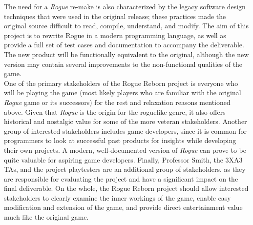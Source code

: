 \documentclass{article}
\begin{document}
The need for a \textit{Rogue} re-make is also characterized by the legacy software design techniques that were used in the original release; these practices made the original source difficult to read, compile, understand, and modify.  The aim of this project is to rewrite Rogue in a modern programming language, as well as provide a full set of test cases and documentation to accompany the deliverable.  The new product will be functionally equivalent to the original, although the new version may contain several improvements to the non-functional qualities of the game.\\

One of the primary stakeholders of the Rogue Reborn project is everyone who will be playing the game (most likely players who are familiar with the original \textit{Rogue} game or its successors) for the rest and relaxation reasons mentioned above.  Given that \textit{Rogue} is the origin for the roguelike genre, it also offers historical and nostalgic value for some of the more veteran stakeholders.  Another group of interested stakeholders includes game developers, since it is common for programmers to look at successful past products for insights while developing their own projects.  A modern, well-documented version of \textit{Rogue} can prove to be quite valuable for aspiring game developers.  Finally, Professor Smith, the 3XA3 TAs, and the project playtesters are an additional group of stakeholders, as they are responsible for evaluating the project and have a significant impact on the final deliverable.  On the whole, the Rogue Reborn project should allow interested stakeholders to clearly examine the inner workings of the game, enable easy modification and extension of the game, and provide direct entertainment value much like the original game.
\end{document}
